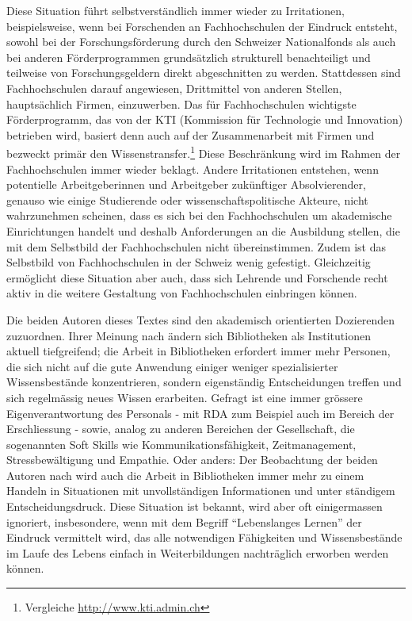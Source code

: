 \documentclass[a4paper,
fontsize=11pt,
oneside,
numbers=noperiodatend,
parskip=half-,
bibliography=totoc,
final
]{scrartcl}
\begin{document}
Diese Situation führt selbstverständlich immer wieder zu Irritationen,
beispielsweise, wenn bei Forschenden an Fachhochschulen der Eindruck
entsteht, sowohl bei der Forschungsförderung durch den Schweizer
Nationalfonds als auch bei anderen Förderprogrammen grundsätzlich
strukturell benachteiligt und teilweise von Forschungsgeldern direkt
abgeschnitten zu werden. Stattdessen sind Fachhochschulen darauf
angewiesen, Drittmittel von anderen Stellen, hauptsächlich Firmen,
einzuwerben. Das für Fachhochschulen wichtigste Förderprogramm, das von
der KTI (Kommission für Technologie und Innovation) betrieben wird,
basiert denn auch auf der Zusammenarbeit mit Firmen und bezweckt primär
den Wissenstransfer.\footnote{Vergleiche \url{http://www.kti.admin.ch}}
Diese Beschränkung wird im Rahmen der Fachhochschulen immer wieder
beklagt. Andere Irritationen entstehen, wenn potentielle
Arbeitgeberinnen und Arbeitgeber zukünftiger Absolvierender, genauso wie
einige Studierende oder wissenschaftspolitische Akteure, nicht
wahrzunehmen scheinen, dass es sich bei den Fachhochschulen um
akademische Einrichtungen handelt und deshalb Anforderungen an die
Ausbildung stellen, die mit dem Selbstbild der Fachhochschulen nicht
übereinstimmen. Zudem ist das Selbstbild von Fachhochschulen in der
Schweiz wenig gefestigt. Gleichzeitig ermöglicht diese Situation aber
auch, dass sich Lehrende und Forschende recht aktiv in die weitere
Gestaltung von Fachhochschulen einbringen können.

Die beiden Autoren dieses Textes sind den akademisch orientierten
Dozierenden zuzuordnen. Ihrer Meinung nach ändern sich Bibliotheken als
Institutionen aktuell tiefgreifend; die Arbeit in Bibliotheken erfordert
immer mehr Personen, die sich nicht auf die gute Anwendung einiger
weniger spezialisierter Wissensbestände konzentrieren, sondern
eigenständig Entscheidungen treffen und sich regelmässig neues Wissen
erarbeiten. Gefragt ist eine immer grössere Eigenverantwortung des
Personals - mit RDA zum Beispiel auch im Bereich der Erschliessung -
sowie, analog zu anderen Bereichen der Gesellschaft, die sogenannten
Soft Skills wie Kommunikationsfähigkeit, Zeitmanagement,
Stressbewältigung und Empathie. Oder anders: Der Beobachtung der beiden
Autoren nach wird auch die Arbeit in Bibliotheken immer mehr zu einem
Handeln in Situationen mit unvollständigen Informationen und unter
ständigem Entscheidungsdruck. Diese Situation ist bekannt, wird aber oft
einigermassen ignoriert, insbesondere, wenn mit dem Begriff
\enquote{Lebenslanges Lernen} der Eindruck vermittelt wird, das alle
notwendigen Fähigkeiten und Wissensbestände im Laufe des Lebens einfach
in Weiterbildungen nachträglich erworben werden können.
\end{document}
